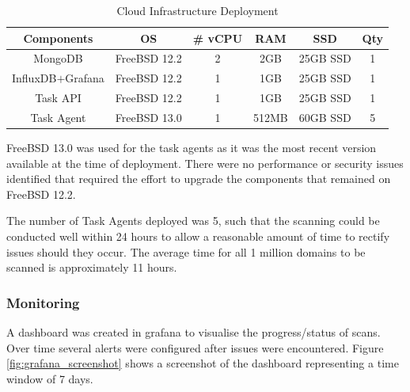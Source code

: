 \documentclass{mscreport}
\begin{document}
\begin{table}[H]
  \begin{center}
    \begin{tabular}{|c|c|c|c|c|c|}  %
      \hline
      \textbf{Components} & \textbf{OS} & \textbf{\# vCPU} & \textbf{RAM} & \textbf{SSD} & \textbf{Qty}\\
      \hline
      MongoDB & FreeBSD 12.2 & 2 & 2GB & 25GB SSD & 1 \\
      \hline
      InfluxDB$+$Grafana & FreeBSD 12.2 & 1 & 1GB & 25GB SSD & 1 \\
      \hline
      Task API & FreeBSD 12.2 & 1 & 1GB & 25GB SSD & 1 \\
      \hline
      Task Agent & FreeBSD 13.0 & 1 & 512MB & 60GB SSD & 5 \\
      \hline
    \end{tabular}
    \caption{Cloud Infrastructure Deployment}
    \label{table:implmentation_cloud} %
  \end{center}
\end{table}

\noindent
FreeBSD 13.0 was used for the task agents as it was the most recent version available at the time of deployment. There were no performance or security issues identified that required the effort to upgrade the components that remained on FreeBSD 12.2.

\vspace{0.3cm} \noindent
The number of Task Agents deployed was 5, such that the scanning could be conducted well within 24 hours to allow a reasonable amount of time to rectify issues should they occur. The average time for all 1 million domains to be scanned is approximately 11 hours.


\subsubsection{Monitoring}

A dashboard was created in grafana to visualise the progress/status of scans. Over time several alerts were configured after issues were encountered. Figure \ref{fig:grafana_screenshot} shows a screenshot of the dashboard representing a time window of 7 days.
\end{document}
